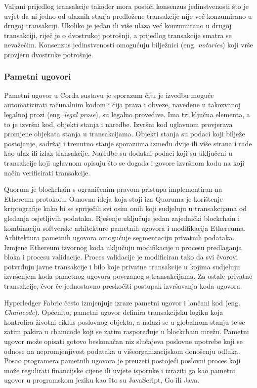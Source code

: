 \documentclass[times, utf8, diplomski]{fer}
\begin{document}
Valjani prijedlog transakcije također mora postići konsenzus jedinstvenosti što je uvjet da ni jedno od ulaznih stanja predložene transakcije nije već konzumirano u drugoj transakciji. Ukoliko je jedan ili više ulaza već konzumirano u drugoj transakciji, riječ je o dvostrukoj potrošnji, a prijedlog transakcije smatra se nevažećim. Konsenzus jedinstvenosti omogućuju bilježnici (eng. \textit{notaries}) koji vrše provjeru dvostruke potrošnje.

\subsubsection{Pametni ugovori}
Pametni ugovor u Corda sustavu je sporazum čiju je izvedbu moguće automatizirati računalnim kodom i čija prava i obveze, navedene u takozvanoj legalnoj prozi (eng. \textit{legal prose}), su legalno provedive. Ima tri ključna elementa, a to je izvršni kod, objekti stanja i naredbe. Izvršni kod uglavnom provjerava promjene objekata stanja u transakcijama. Objekti stanja su podaci koji bilježe postojanje, sadržaj i trenutno stanje sporazuma između dvije ili više strana i rade kao ulaz ili izlaz transakcije. Naredbe su dodatni podaci koji su uključeni u transakcije koji uglavnom opisuju što se događa i govore izvršnom kodu na koji način verificirati transakcije.  \cite{smartcontract} 

Quorum je blockchain s ograničenim pravom pristupa implementiran na Ethereum protokolu. Osnovna ideja koja stoji iza Quoruma je korištenje kriptografije kako bi se spriječili svi osim onih koji sudjeluju u transakcijama od gledanja osjetljivih podataka. Rješenje uključuje jedan zajednički blockchain i kombinaciju softverske arhitekture pametnih ugovora i modifikacija Ethereuma. Arhitektura pametnih ugovora omogućuje segmentaciju privatnih podataka. Izmjene Ethereum izvornog koda uključuju modifikacije u procesu predlaganja bloka i procesu validacije. Proces validacije je modificiran tako da svi čvorovi potvrđuju javne transakcije i bilo koje privatne transakcije u kojima sudjeluju izvršenjem koda pametnog ugovora povezanog s transakcijama. Za ostale privatne transakcije, čvor će jednostavno preskočiti postupak izvršavanja koda ugovora. \cite{Quorum}

Hyperledger Fabric često izmjenjuje izraze pametni ugovor i lančani kod (eng. \textit{Chaincode}). Općenito, pametni ugovor definira transakcijsku logiku koja kontrolira životni ciklus poslovnog objekta, a nalazi se u globalnom stanju te se zatim pakira u chaincode koji se zatim raspoređuje u blockchain mrežu. Pametni ugovor može opisati gotovo beskonačan niz slučajeva poslovne upotrebe koji se odnose na nepromjenjivost podataka u višeorganizacijskom donošenju odluka. Posao programera pametnih ugovora je preuzeti postojeći poslovni proces koji može regulirati financijske cijene ili uvjete isporuke i izraziti ga kao pametni ugovor u programskom jeziku kao što su JavaScript, Go ili Java. \cite{Fabric}
\end{document}
